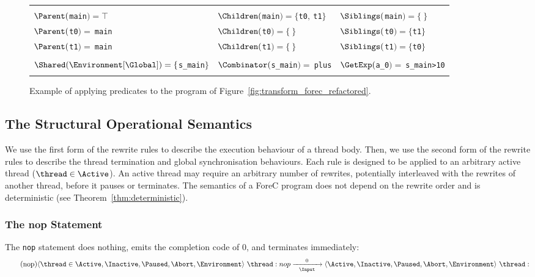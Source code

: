\begin{figure}[ht]
	\centering
	\begin{tabular}{|l l l|}
		\hline
												&																			&														\\
		$\Parent($\verb$main$$) = \top$			& $\Children($\verb$main$$) = \lbrace$\verb$t0$$,~$\verb$t1$$\rbrace$		& $\Siblings($\verb$main$$) = \lbrace ~ \rbrace$		\\
		$\Parent($\verb$t0$$) =~$\verb$main$	& $\Children($\verb$t0$$) = \lbrace ~ \rbrace$								& $\Siblings($\verb$t0$$) = \lbrace$\verb$t1$$\rbrace$	\\
		$\Parent($\verb$t1$$) =~$\verb$main$	& $\Children($\verb$t1$$) = \lbrace ~ \rbrace$								& $\Siblings($\verb$t1$$) = \lbrace$\verb$t0$$\rbrace$	\\
												&																			&														\\
		$\Shared(\Environment[\Global]) = \lbrace$\verb$s_main$$\rbrace$	& $\Combinator($\verb$s_main$$) =~$\verb$plus$	& $\GetExp($\verb$a_0$$) =~$\verb$s_main>10$			\\
												&																			&														\\
		\hline
	\end{tabular}
	
	\caption{Example of applying predicates to the program of Figure~\ref{fig:transform_forec_refactored}.}
	\label{fig:forec_predicates}
\end{figure}


\subsection{The Structural Operational Semantics}
We use the first form of the rewrite rules to 
describe the execution behaviour of a thread body. 
Then, we use the second form of the rewrite rules to 
describe the thread termination and global synchronisation
behaviours. Each rule is designed to be applied to 
an arbitrary active thread ($\thread \in \Active$). 
An active thread may require an arbitrary number of 
rewrites, potentially interleaved with the rewrites 
of another thread, before it pauses or terminates. 
The semantics of a ForeC program does not depend on 
the rewrite order and is deterministic 
(see Theorem~\ref{thm:deterministic}).

\subsubsection{The nop Statement}
The \verb$nop$ statement does nothing, emits
the completion code of $0$, and terminates 
immediately:
\begin{equation*}	
	\tag{nop}
	\label{forec:nop}
	\langle \thread \in \Active, \Inactive, \Paused, \Abort, \Environment \rangle ~ \thread:nop
		\xrightarrow[~~\Input~~]{0} 
	\langle \Active, \Inactive, \Paused, \Abort, \Environment \rangle ~ \thread: 
\end{equation*}

